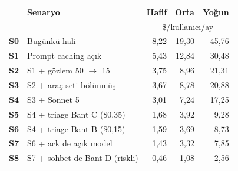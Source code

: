 \begin{tabular}{@{}llrrr@{}}
\toprule
& \textbf{Senaryo} & \textbf{Hafif} & \textbf{Orta} & \textbf{Yoğun} \\
& & \multicolumn{3}{c}{\footnotesize \$/kullanıcı/ay} \\
\midrule
\textbf{S0} & Bugünkü hali & 8,22 & 19,30 & 45,76 \\
\textbf{S1} & Prompt caching açık & 5,43 & 12,84 & 30,48 \\
\textbf{S2} & S1 + gözlem 50 $\rightarrow$ 15 & 3,75 & 8,96 & 21,31 \\
\textbf{S3} & S2 + araç seti bölünmüş & 3,67 & 8,78 & 20,88 \\
\textbf{S4} & S3 + Sonnet 5 & 3,01 & 7,24 & 17,25 \\
\textbf{S5} & S4 + triage Bant C (\$0,35) & 1,68 & 3,92 & 9,28 \\
\textbf{S6} & S4 + triage Bant B (\$0,15) & 1,59 & 3,69 & 8,73 \\
\textbf{S7} & S6 + ack de açık model & 1,43 & 3,32 & 7,85 \\
\textbf{S8} & S7 + sohbet de Bant D (riskli) & 0,46 & 1,08 & 2,56 \\
\bottomrule
\end{tabular}
